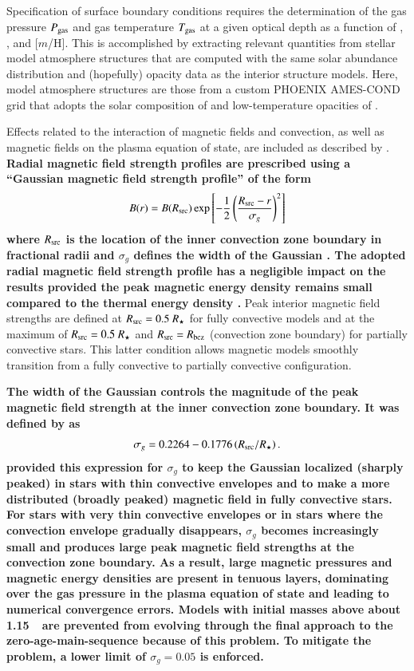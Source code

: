 \documentclass{aa}
\begin{document}
Specification of surface boundary conditions requires the determination of the gas pressure $P_{\rm gas}$ and gas temperature $T_{\rm gas}$ at a given optical depth as a function of \logg, \teff, and [$m$/H]. This is accomplished by extracting relevant quantities from stellar model atmosphere structures that are computed with the same solar abundance distribution and (hopefully) opacity data as the interior structure models. Here, model atmosphere structures are those from a custom PHOENIX AMES-COND grid \citep{Hauschildt1999a, Hauschildt1999b, Dotter2008} that adopts the solar composition of \citet{GS98} and low-temperature opacities of \citet{Ferguson2005}.

Effects related to the interaction of magnetic fields and convection, as well as magnetic fields on the plasma equation of state, are included as described by \citet{FC12b,FC13}. {\bf Radial magnetic field strength profiles are prescribed using a ``Gaussian magnetic field strength profile'' of the form
\begin{equation}
	B(r) = B(R_{\rm src}) \exp\left[-\frac{1}{2}\left(\frac{R_{\rm src} - r}{\sigma_g}\right)^2\right]
\end{equation}
where $R_{\rm src}$ is the location of the inner convection zone boundary in fractional radii and $\sigma_g$ defines the width of the Gaussian \citep{FC13}. The adopted radial magnetic field strength profile has a negligible impact on the results provided the peak magnetic energy density remains small compared to the thermal energy density \citep{FC13,FC14,FC14b}.}
Peak interior magnetic field strengths are defined at $R_{\rm src} = 0.5\ R_{\star}$ for fully convective models and at the maximum of $R_{\rm src} = 0.5\ R_{\star}$ and $R_{\rm src} = R_{\rm bcz}$ (convection zone boundary) for partially convective stars. This latter condition allows magnetic models smoothly transition from a fully convective to partially convective configuration. 

{\bf The width of the Gaussian controls the magnitude of the peak magnetic field strength at the inner convection zone boundary. It was defined by \citet{FC13} as
\begin{equation}
	\sigma_g = 0.2264 - 0.1776 \left(R_{\rm src}/R_{\star}\right).
\end{equation}
\citet{FC13} provided this expression for $\sigma_g$ to keep the Gaussian localized (sharply peaked) in stars with thin convective envelopes and to make a more distributed (broadly peaked) magnetic field in fully convective stars. For stars with very thin convective envelopes or in stars where the convection envelope gradually disappears, $\sigma_g$ becomes increasingly small and produces large peak magnetic field strengths at the convection zone boundary. As a result, large magnetic pressures and magnetic energy densities are present in tenuous layers, dominating over the gas pressure in the plasma equation of state and leading to numerical convergence errors. Models with initial masses above about 1.15~\msun\ are prevented from evolving through the final approach to the zero-age-main-sequence because of this problem. To mitigate the problem, a lower limit of $\sigma_g = 0.05$ is enforced.}
\end{document}
